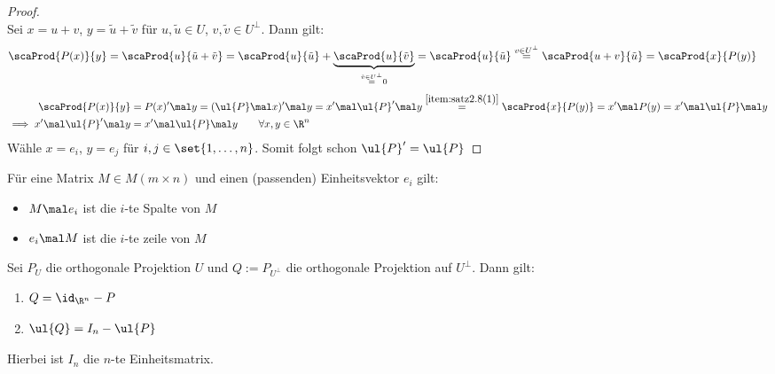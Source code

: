 \begin{proof}
	\\
	Sei $x=u+v$, $y=\tilde{u}+\tilde{v}$ für $u,\tilde{u}\in U$, $v,\tilde{v}\in U^\perp$.
	Dann gilt:
	\begin{align*}
		\scaProd{P(x)}{y}
		&=\scaProd{u}{\tilde{u}+\tilde{v}}
		=\scaProd{u}{\tilde{u}}+\underbrace{\scaProd{u}{\tilde{v}}}_{\overset{\tilde{v}\in U^\perp}{=}0}
		=\scaProd{u}{\tilde{u}}
		\overset{v\in U^\perp}{=}
		\scaProd{u+v}{\tilde{u}}
		=\scaProd{x}{P(y)}
	\end{align*}
	\begin{align*}
		\scaProd{P(x)}{y}
		&=P(x)'\mal y
		=(\ul{P}\mal x)'\mal y
		=x'\mal \ul{P}'\mal y
		\overset{\ref{item:satz2.8(1)}}{=}
		\scaProd{x}{P(y)}
		=x'\mal P(y)
		=x'\mal\ul{P}\mal y\\
		\implies x'\mal \ul{P}'\mal y&=x'\mal\ul{P}\mal y\qquad\forall x,y\in\R^n
	\end{align*}
	Wähle $x=e_i$, $y=e_j$ für $i,j\in\set{1,\ldots,n}$.
	Somit folgt schon $\ul{P}'=\ul{P}$
\end{proof}

\begin{erinnerung}
	Für eine Matrix $M\in M(m\times n)$ und einen (passenden) Einheitsvektor $e_i$  gilt: %
	\begin{itemize}
		\item $M\mal e_i$ ist die $i$-te Spalte von $M$
		\item $e_i\mal M$ ist die $i$-te zeile von $M$
	\end{itemize}
\end{erinnerung}

\begin{satz}\label{satz2.9}
	Sei $P_U$ die orthogonale Projektion $U$ und $Q:=P_{U^\perp}$ die orthogonale Projektion auf $U^\perp$.
	Dann gilt:
	\begin{enumerate}[label=(\arabic*)]
		\item $\begin{aligned}
			 Q=\id_{\R^n}-P
		\end{aligned}$ \label{item:satz2.9(1)}
		\item $\begin{aligned}
			 \ul{Q}=I_n-\ul{P}
		\end{aligned}$ \label{item:satz2.9(2)}
	\end{enumerate}
	Hierbei ist $I_n$ die $n$-te Einheitsmatrix.
\end{satz}

